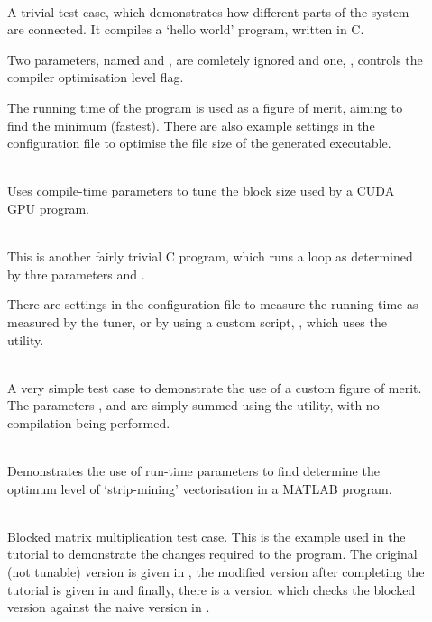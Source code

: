 \documentclass[a4paper, draft]{article}
\begin{document}
\begin{description}
    
    \item[] \hfill \\
        A trivial test case, which demonstrates how different parts of the 
        system are connected. It compiles a `hello world' program, 
        written in C.
        
        Two parameters, named  and , are comletely 
        ignored and one, , controls the compiler 
        optimisation level flag.
        
        The running time of the program is used as a figure of merit, aiming 
        to find the minimum (fastest). There are also example settings in the 
        configuration file to optimise the file size of the generated 
        executable.
        
    \item[] \hfill \\
        Uses compile-time parameters to tune the block size used by a CUDA GPU 
        program.
    
    \item[] \hfill \\
        This is another fairly trivial C program, which runs a loop as 
        determined by thre parameters  and .
        
        There are settings in the configuration file to measure the running 
        time as measured by the tuner, or by using a custom script, 
        , which uses the  utility.
        
    \item[] \hfill \\
        A very simple test case to demonstrate the use of a custom figure of 
        merit. The parameters ,  and  are simply summed 
        using the  utility, with no compilation being performed.
        
    \item[] \hfill \\
        Demonstrates the use of run-time parameters to find determine the 
        optimum level of `strip-mining' vectorisation in a MATLAB program.
    
    \item[] \hfill \\
        Blocked matrix multiplication test case. This is the example used in 
        the tutorial to demonstrate the changes required to the program. The 
        original (not tunable) version is given in , 
        the modified version after completing the tutorial is given in 
         and finally, there is a version which 
        checks the blocked version against the naive version in 
        .
        
    
\end{description}
\end{document}
